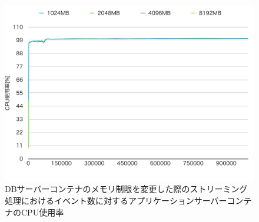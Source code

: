 \documentclass[../../../../../main]{subfiles}
\begin{document}
    \begin{figure}[H]
        \centering
        \includegraphics[width=12cm]{graph}
        \caption{DBサーバーコンテナのメモリ制限を変更した際のストリーミング処理におけるイベント数に対するアプリケーションサーバーコンテナのCPU使用率}
        \label{fig:stream-change-db-memory-limit-app-cpu-app_4_8192-db_400}
    \end{figure}
\end{document}
